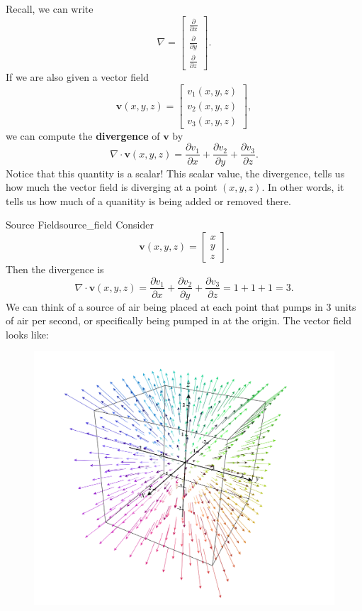         Recall, we can write
        \[
        \nabla = \begin{bmatrix} \frac{\partial}{\partial x} \\ \frac{\partial}{\partial y} \\ \frac{\partial}{\partial z} \end{bmatrix}.
        \]
        If we are also given a vector field
        \[
        \mathbf{v}(x,y,z) = \begin{bmatrix} v_1(x,y,z) \\ v_2(x,y,z) \\ v_3(x,y,z) \end{bmatrix},
        \]
        we can compute the \textbf{divergence} of $\mathbf{v}$ by
        \[
        \nabla \cdot \mathbf{v}(x,y,z) = \frac{\partial v_1}{\partial x} + \frac{\partial v_2}{\partial y} + \frac{\partial v_3}{\partial z}.
        \]
        Notice that this quantity is a scalar!  This scalar value, the divergence, tells us how much the vector field is diverging at a point $(x,y,z)$. In other words, it tells us how much of a quanitity is being added or removed there.
        
        \begin{ex}{Source Field}{source_field}
        Consider
        \[
        \mathbf{v}(x,y,z) = \begin{bmatrix} x \\ y \\ z \end{bmatrix}.
        \]
        Then the divergence is
        \[
        \nabla \cdot \mathbf{v}(x,y,z) = \frac{\partial v_1}{\partial x} + \frac{\partial v_2}{\partial y} + \frac{\partial v_3}{\partial z} = 1 + 1 + 1 = 3.
        \]
        We can think of a source of air being placed at each point that pumps in $3$ units of air per second, or specifically being pumped in at the origin. The vector field looks like:
        \begin{figure}[H]
            \centering
            \includegraphics[width=.6\textwidth]{Figures_Part_6/divergence_field.png}
        \end{figure}
        \end{ex}
        
